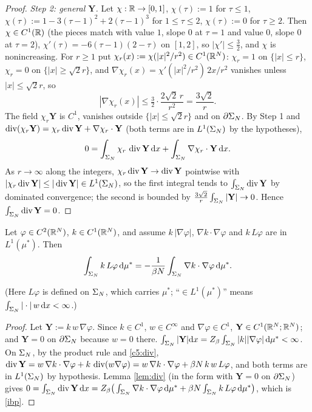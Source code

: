 \begin{proof}
\emph{Step 2: general $\mathbf Y$.} Let $\chi:\mathbb{R}\to[0,1]$, $\chi(\tau):=1$ for $\tau\le1$, $\chi(\tau):=1-3(\tau-1)^2+2(\tau-1)^3$ for $1\le\tau\le2$, $\chi(\tau):=0$ for $\tau\ge2$. Then $\chi\in C^1(\mathbb{R})$ (the pieces match with value $1$, slope $0$ at $\tau=1$ and value $0$, slope $0$ at $\tau=2$), $\chi'(\tau)=-6(\tau-1)(2-\tau)$ on $[1,2]$, so $|\chi'|\le\frac32$, and $\chi$ is nonincreasing.
For $r\ge1$ put $\chi_r(x):=\chi(|x|^2/r^2)\in C^1(\mathbb{R}^N)$: $\chi_r=1$ on $\{|x|\le r\}$, $\chi_r=0$ on $\{|x|\ge\sqrt2r\}$, and $\nabla\chi_r(x)=\chi'(|x|^2/r^2)\,2x/r^2$ vanishes unless $|x|\le\sqrt2r$, so
\[|\nabla\chi_r(x)|\le\tfrac32\cdot\frac{2\sqrt2\,r}{r^2}=\frac{3\sqrt2}{r}.\]
The field $\chi_r\mathbf Y$ is $C^1$, vanishes outside $\{|x|\le\sqrt2r\}$ and on $\partial\Sigma_N$. By Step 1 and $\operatorname{div}(\chi_r\mathbf Y)=\chi_r\operatorname{div}\mathbf Y+\nabla\chi_r\cdot\mathbf Y$ (both terms are in $L^1(\Sigma_N)$ by the hypotheses),
\[0=\int_{\Sigma_N}\chi_r\,\operatorname{div}\mathbf Y\,\mathrm{d} x+\int_{\Sigma_N}\nabla\chi_r\cdot\mathbf Y\,\mathrm{d} x .\]
As $r\to\infty$ along the integers, $\chi_r\operatorname{div}\mathbf Y\to\operatorname{div}\mathbf Y$ pointwise with $|\chi_r\operatorname{div}\mathbf Y|\le|\operatorname{div}\mathbf Y|\in L^1(\Sigma_N)$, so the first integral tends to $\int_{\Sigma_N}\operatorname{div}\mathbf Y$ by dominated convergence; the second is bounded by $\frac{3\sqrt2}r\int_{\Sigma_N}|\mathbf Y|\to0$. Hence $\int_{\Sigma_N}\operatorname{div}\mathbf Y=0$.
\end{proof}

\begin{corollary}\label{cor:ibp}
Let $\varphi\in C^2(\mathbb{R}^N)$, $k\in C^1(\mathbb{R}^N)$, and assume $k\,|\nabla\varphi|$, $\nabla k\cdot\nabla\varphi$ and $k\,L\varphi$ are in $L^1(\mu^*)$. Then
\begin{equation}\label{ibp}
\int_{\Sigma_N}k\,L\varphi\,\mathrm{d}\mu^*=-\frac1{\beta N}\int_{\Sigma_N}\nabla k\cdot\nabla\varphi\,\mathrm{d}\mu^* .
\end{equation}
\end{corollary}
\noindent(Here $L\varphi$ is defined on $\Sigma_N$, which carries $\mu^*$; ``$\in L^1(\mu^*)$'' means $\int_{\Sigma_N}|\cdot|\,w\,\mathrm{d} x<\infty$.)

\begin{proof}
Let $\mathbf Y:=k\,w\,\nabla\varphi$. Since $k\in C^1$, $w\in C^\infty$ and $\nabla\varphi\in C^1$, $\mathbf Y\in C^1(\mathbb{R}^N;\mathbb{R}^N)$; and $\mathbf Y=0$ on $\partial\Sigma_N$ because $w=0$ there.
$\int_{\Sigma_N}|\mathbf Y|\mathrm{d} x=Z_\beta\int_{\Sigma_N}|k||\nabla\varphi|\,\mathrm{d}\mu^*<\infty$.
On $\Sigma_N$, by the product rule and \eqref{c5:div},
$\operatorname{div}\mathbf Y=w\,\nabla k\cdot\nabla\varphi+k\,\operatorname{div}(w\nabla\varphi)=w\,\nabla k\cdot\nabla\varphi+\beta N\,k\,w\,L\varphi$,
and both terms are in $L^1(\Sigma_N)$ by hypothesis. Lemma \ref{lem:div} (in the form with $\mathbf Y=0$ on $\partial\Sigma_N$) gives
$0=\int_{\Sigma_N}\operatorname{div}\mathbf Y\,\mathrm{d} x=Z_\beta\big(\int_{\Sigma_N}\nabla k\cdot\nabla\varphi\,\mathrm{d}\mu^*+\beta N\int_{\Sigma_N}k\,L\varphi\,\mathrm{d}\mu^*\big)$, which is \eqref{ibp}.
\end{proof}

